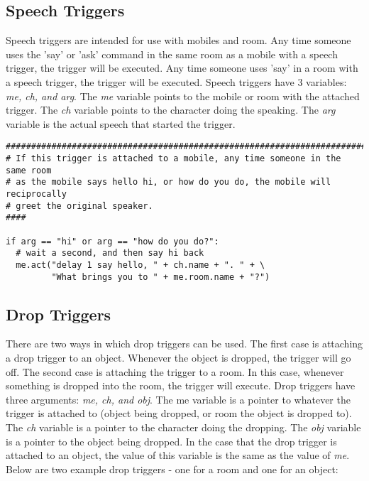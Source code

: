 \documentclass[12pt]{article}
\begin{document}
\subsection{Speech Triggers}
Speech triggers are intended for use with mobiles and room. Any time someone uses the 'say' or 'ask' command in the same room as a mobile with a speech trigger, the trigger will be executed. Any time someone uses 'say' in a room with a speech trigger, the trigger will be executed. Speech triggers have 3 variables: {\it me, ch, and arg}. The {\it me} variable points to the mobile or room with the attached trigger. The {\it ch} variable points to the character doing the speaking. The {\it arg} variable is the actual speech that started the trigger.

{\bf \begin{verbatim}
################################################################################
# If this trigger is attached to a mobile, any time someone in the same room
# as the mobile says hello hi, or how do you do, the mobile will reciprocally 
# greet the original speaker.
####

if arg == "hi" or arg == "how do you do?":
  # wait a second, and then say hi back
  me.act("delay 1 say hello, " + ch.name + ". " + \
         "What brings you to " + me.room.name + "?")
\end{verbatim}}

\subsection{Drop Triggers}
There are two ways in which drop triggers can be used. The first case is attaching a drop trigger to an object. Whenever the object is dropped, the trigger will go off. The second case is attaching the trigger to a room. In this case, whenever something is dropped into the room, the trigger will execute. Drop triggers have three arguments: {\it me, ch, and obj}. The me variable is a pointer to whatever the trigger is attached to (object being dropped, or room the object is dropped to). The {\it ch} variable is a pointer to the character doing the dropping. The {\it obj} variable is a pointer to the object being dropped. In the case that the drop trigger is attached to an object, the value of this variable is the same as the value of {\it me}. Below are two example drop triggers - one for a room and one for an object:
\end{document}
